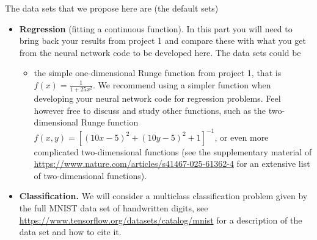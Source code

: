 \documentclass[11pt,a4paper]{article}
\begin{document}
The data sets that we propose here are (the default sets)
\begin{itemize}[nosep]
  \item \textbf{Regression} (fitting a continuous function).  In this part
        you will need to bring back your results from project 1 and compare
        these with what you get from the neural network code to be developed
        here.  The data sets could be
  \begin{itemize}[nosep]
    \item the simple one-dimensional Runge function from project 1, that is
          $f(x) = \frac{1}{1+25x^2}$.  We recommend using a simpler function
          when developing your neural network code for regression problems.
          Feel however free to discuss and study other functions, such as the
          two-dimensional Runge function
          $f(x,y)=\left[(10x - 5)^2 + (10y - 5)^2 + 1 \right]^{-1}$, or even
          more complicated two-dimensional functions (see the supplementary
          material of \url{https://www.nature.com/articles/s41467-025-61362-4}
          for an extensive list of two-dimensional functions).
  \end{itemize}
  \item \textbf{Classification.}  We will consider a multiclass
        classification problem given by the full MNIST data set of
        handwritten digits, see
        \url{https://www.tensorflow.org/datasets/catalog/mnist} for a
        description of the data set and how to cite it.
\end{itemize}
\end{document}
